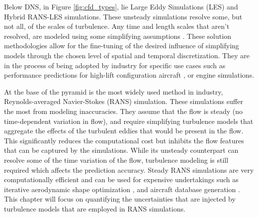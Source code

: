Below DNS, in Figure \ref{fig:cfd_types}, lie Large Eddy Simulations (LES) and Hybrid RANS-LES simulations.
These unsteady simulations resolve some, but not all, of the scales of turbulence.
Any time and length scales that aren't resolved, are modeled using some simplifying assumptions \cite{pope_2000}.
These solution methodologies allow for the fine-tuning of the desired influence of simplifying models through the chosen level of spatial and temporal discretization.
They are in the process of being adopted by industry for specific use cases such as performance predictions for high-lift configuration aircraft \cite{rumsey2019overview}, or engine simulations. 

At the base of the pyramid is the most widely used method in industry, Reynolds-averaged Navier-Stokes (RANS) simulation.
These simulations suffer the most from modeling inaccuracies.
They assume that the flow is steady (no time-dependent variation in flow), and require simplifying turbulence models that aggregate the effects of the turbulent eddies that would be present in the flow.
This significantly reduces the computational cost but inhibits the flow features that can be captured by the simulations.
While its unsteady counterpart can resolve some of the time variation of the flow, turbulence modeling is still required which affects the prediction accuracy.
Steady RANS simulations are very computationally efficient and can be used for expensive undertakings such as iterative aerodynamic shape optimization \cite{lyu2015aerodynamic}, and aircraft database generation \cite{wendorff_combining_2016}.
This chapter will focus on quantifying the uncertainties that are injected by turbulence models that are employed in RANS simulations. 